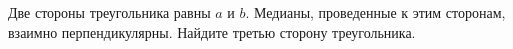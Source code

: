 \begin{ex}
	\begin{condition}
		Две стороны треугольника равны \( a \) и \( b \). Медианы, проведенные к этим сторонам, взаимно перпендикулярны. Найдите третью сторону треугольника.
	\end{condition}
\end{ex}